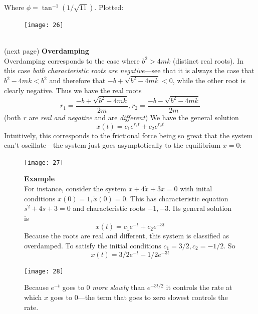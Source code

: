 \documentclass{report}
\begin{document}
Where $\phi=\tan^{-1}(1/\sqrt{11})$. Plotted:
\begin{figure}[h]
\begin{center}
\texttt{[image: 26]}\\
\end{center}
\end{figure}\\
(next page)
\newpage
\noindent\textbf{Overdamping}\\
Overdamping corresponds to the case where $b^2>4mk$ (distinct real roots). In this case \textit{both characteristic roots are negative}---see that it is always the case that
$b^2-4mk<b^2$ and therefore that $-b+\sqrt{b^2-4mk}<0$, while the other root is clearly negative. Thus we have
the real roots
\begin{equation*}
r_1=\frac{-b+\sqrt{b^2-4mk}}{2m},r_2=\frac{-b-\sqrt{b^2-4mk}}{2m}
\end{equation*}
(both $r$ are \textit{real and negative} and are \textit{different}) We have the general solution
\begin{equation*}
x(t)=c_1e^{r_1t}+c_2e^{r_2t}
\end{equation*}
Intuitively, this corresponds to the frictional force being so great that the system can't oscillate---the system
just goes asymptotically to the equilibrium $x=0$:
\begin{figure}[h]
\begin{center}
\texttt{[image: 27]}\\
\end{center}
\textbf{Example}\\
For instance, consider the system $\ddot{x}+4\dot{x}+3x=0$ with inital conditions $x(0)=1,\dot{x}(0)=0$. This has
characteristic equation $s^2+4s+3=0$ and characteristic roots $-1,-3$. Its general solution is
\begin{equation*}
x(t)=c_1e^{-t}+c_2e^{-3t}
\end{equation*}
Because the roots are real and different, this system is classified as overdamped. To satisfy the initial conditions
$c_1=3/2,c_2=-1/2$. So 
\begin{equation*}
x(t)=3/2e^{-t}-1/2e^{-3t}
\end{equation*}
\begin{center}
\texttt{[image: 28]}\\
\end{center}
Because $e^{-t}$ goes to 0 \textit{more slowly} than $e^{-3t/2}$ it controls the rate at which
$x$ goes to 0---the term that goes to zero slowest controls the rate.
\end{figure}\\
\end{document}
